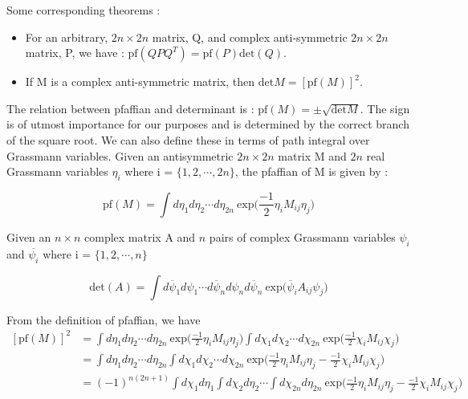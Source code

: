 Some corresponding theorems :

\begin{itemize}
\item For an arbitrary, $ 2n \times 2n$ matrix, Q, and complex anti-symmetric $ 2n \times 2n$ matrix, P, we have : $\text{pf}(QPQ^{T}) = \text{pf}(P) \text{det}(Q)$. 
\item If M is a complex anti-symmetric matrix, then $\text{det} M = [\text{pf}(M)]^{2}$.
\end{itemize}

The relation between pfaffian and determinant is : $\text{pf}(M) = \pm \sqrt{\text{det}M}$. The sign is of utmost importance for our purposes and is 
determined by the correct branch of the square root. 
We can also define these in terms of path integral over Grassmann variables. Given an antisymmetric $ 2n \times 2n$ matrix M and $2n$ real 
Grassmann variables $\eta_{i}$ where i = $\{1, 2, \cdots, 2n\}$, the pfaffian of M is given by :


\begin{equation}
\text{pf}(M) =  \int  d\eta_{1} d\eta_{2} \cdots d\eta_{2n} ~ \text{exp} \Bigg( \frac{-1}{2}\eta_{i} M_{ij} \eta_{j}\Bigg)
\end{equation}


Given an $ n \times n$ complex matrix A and $n$ pairs of complex Grassmann variables $\psi_{i}$ and $\overline{\psi_i}$ 
where i = $\{1, 2, \cdots, n\}$ 

\begin{equation}
\label{eq:det_formula}
\text{det}(A) =  \int  d\overline{\psi}_{1} d\psi_{1} \cdots d\overline{\psi}_{n} d\psi_{n} d\overline{\psi}_{n} ~ \text{exp}  \Big( \overline{\psi}_{i} A_{ij} \psi_{j}\Big)
\end{equation}

From the definition of pfaffian, we have
\begin{align}
\label{pfaffian0}
[\text{pf}(M)]^{2}&=  \int  d\eta_{1} d\eta_{2} \cdots d\eta_{2n} ~ \text{exp} \Big( \frac{-1}{2}\eta_{i} M_{ij} \eta_{j}\Big) \int  d\chi_{1} d\chi_{2} \cdots d\chi_{2n} ~ \text{exp} \Big( \frac{-1}{2}\chi_{i} M_{ij} \chi_{j}\Big)\\
                         &= \int  d\eta_{1} d\eta_{2} \cdots d\eta_{2n}  \int  d\chi_{1} d\chi_{2} \cdots d\chi_{2n} ~ \text{exp} \Big( \frac{-1}{2}\eta_{i} M_{ij} \eta_{j} -  \frac{-1}{2}\chi_{i} M_{ij} \chi_{j}\Big)\\
                         &=(-1)^{n(2n+1)} \int d\chi_{1} d\eta_{1}\int d\chi_{2} d\eta_{2} \cdots \int d\chi_{2n} d\eta_{2n} ~ \text{exp} \Big( \frac{-1}{2}\eta_{i} M_{ij} \eta_{j} -  \frac{-1}{2}\chi_{i} M_{ij} \chi_{j}\Big) \\
\end{align}

